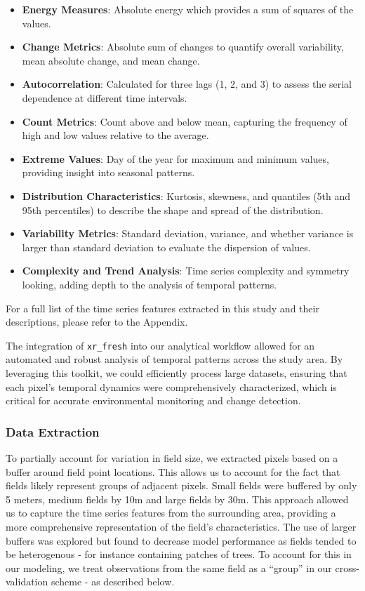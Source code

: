 \documentclass[
  journal,
  twocolumn]{IEEEtran}
\providecommand{\tightlist}{%
  \setlength{\itemsep}{0pt}\setlength{\parskip}{0pt}}
\begin{document}
\begin{itemize}
\tightlist
\item
  \textbf{Energy Measures}: Absolute energy which provides a sum of
  squares of the values.
\item
  \textbf{Change Metrics}: Absolute sum of changes to quantify overall
  variability, mean absolute change, and mean change.
\item
  \textbf{Autocorrelation}: Calculated for three lags (1, 2, and 3) to
  assess the serial dependence at different time intervals.
\item
  \textbf{Count Metrics}: Count above and below mean, capturing the
  frequency of high and low values relative to the average.
\item
  \textbf{Extreme Values}: Day of the year for maximum and minimum
  values, providing insight into seasonal patterns.
\item
  \textbf{Distribution Characteristics}: Kurtosis, skewness, and
  quantiles (5th and 95th percentiles) to describe the shape and spread
  of the distribution.
\item
  \textbf{Variability Metrics}: Standard deviation, variance, and
  whether variance is larger than standard deviation to evaluate the
  dispersion of values.
\item
  \textbf{Complexity and Trend Analysis}: Time series complexity and
  symmetry looking, adding depth to the analysis of temporal patterns.
\end{itemize}

For a full list of the time series features extracted in this study and
their descriptions, please refer to the Appendix.

The integration of \texttt{xr\_fresh} into our analytical workflow
allowed for an automated and robust analysis of temporal patterns across
the study area. By leveraging this toolkit, we could efficiently process
large datasets, ensuring that each pixel's temporal dynamics were
comprehensively characterized, which is critical for accurate
environmental monitoring and change detection.

\subsubsection{Data Extraction}\label{data-extraction}

To partially account for variation in field size, we extracted pixels
based on a buffer around field point locations. This allows us to
account for the fact that fields likely represent groups of adjacent
pixels. Small fields were buffered by only 5 meters, medium fields by
10m and large fields by 30m. This approach allowed us to capture the
time series features from the surrounding area, providing a more
comprehensive representation of the field's characteristics. The use of
larger buffers was explored but found to decrease model performance as
fields tended to be heterogenous - for instance containing patches of
trees. To account for this in our modeling, we treat observations from
the same field as a ``group'' in our cross-validation scheme - as
described below.
\end{document}

